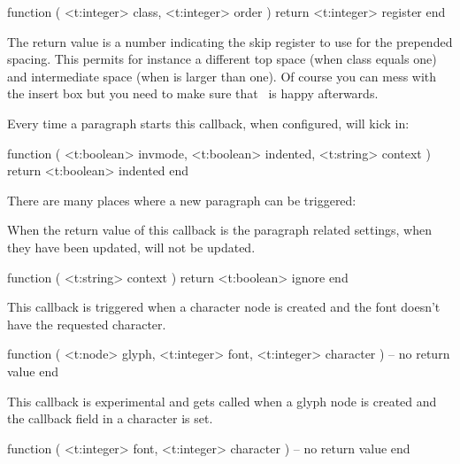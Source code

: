 \starttyping[option=LUA]
function (
    <t:integer> class,
    <t:integer> order
)
    return <t:integer> register
end
\stoptyping

The return value is a number indicating the skip register to use for the
prepended spacing. This permits for instance a different top space (when \type
{class} equals one) and intermediate space (when  is larger than
one). Of course you can mess with the insert box but you need to make sure that
\LUATEX\ is happy afterwards.

\stopsubsection

\startsubsection[title=begin_paragraph]

Every time a paragraph starts this callback, when configured, will kick in:

\starttyping[option=LUA]
function (
    <t:boolean> invmode,
    <t:boolean> indented,
    <t:string>  context
)
    return <t:boolean> indented
end
\stoptyping

There are many places where a new paragraph can be triggered:

\startcolumns[n=4]
\stopcolumns

\stopsubsection

\startsubsection[title=paragraph_context]

When the return value of this callback is  the paragraph related
settings, when they have been updated, will not be updated.

\starttyping[option=LUA]
function (
    <t:string> context
)
    return <t:boolean> ignore
end
\stoptyping

\stopsubsection

\startsubsection[title=missing_character]

This callback is triggered when a character node is created and the font doesn't
have the requested character.

\starttyping[option=LUA]
function (
    <t:node>    glyph,
    <t:integer> font,
    <t:integer> character
)
    -- no return value
end
\stoptyping

\stopsubsection

\startsubsection[title=process_character]

This callback is experimental and gets called when a glyph node is created and
the callback field in a character is set.

\starttyping[option=LUA]
function (
    <t:integer> font,
    <t:integer> character
)
    -- no return value
end
\stoptyping


